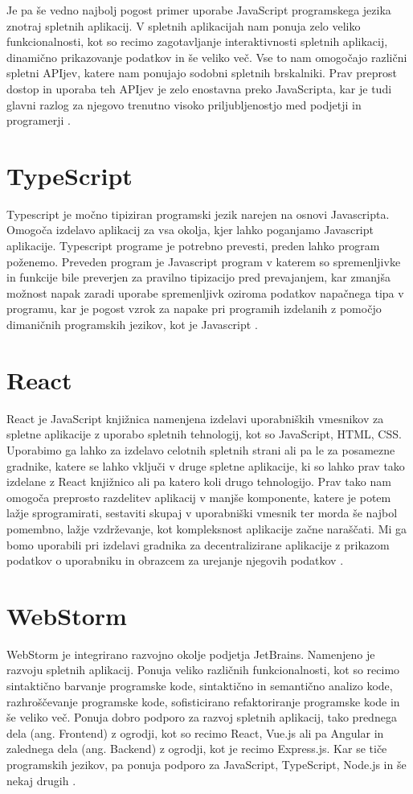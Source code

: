 \documentclass[a4paper,12pt,openright]{book}
\begin{document}
Je pa še vedno najbolj pogost primer uporabe JavaScript programskega jezika znotraj spletnih aplikacij.
V spletnih aplikacijah nam ponuja zelo veliko funkcionalnosti, kot so recimo zagotavljanje interaktivnosti spletnih
aplikacij, dinamično prikazovanje podatkov in še veliko več.
Vse to nam omogočajo različni spletni APIjev, katere nam ponujajo sodobni spletnih brskalniki.
Prav preprost dostop in uporaba teh APIjev je zelo enostavna preko JavaScripta, kar je tudi glavni razlog za njegovo
trenutno visoko priljubljenostjo med podjetji in programerji \cite{javascript_mozilla}.

\section{TypeScript}
Typescript je močno tipiziran programski jezik narejen na osnovi Javascripta. 
Omogoča izdelavo aplikacij za vsa okolja, kjer lahko poganjamo Javascript aplikacije.
Typescript programe je potrebno prevesti, preden lahko program poženemo.
Preveden program je Javascript program v katerem so spremenljivke in funkcije bile preverjen za pravilno tipizacijo 
pred prevajanjem, kar zmanjša možnost napak zaradi uporabe spremenljivk oziroma podatkov napačnega tipa v programu, 
kar je pogost vzrok za napake pri programih izdelanih z pomočjo dimaničnih programskih jezikov, kot je Javascript \cite{typescript_homepage}.

\section{React}
React je JavaScript knjižnica namenjena izdelavi uporabniških vmesnikov za spletne aplikacije z uporabo spletnih tehnologij, kot so JavaScript, HTML, CSS.
Uporabimo ga lahko za izdelavo celotnih spletnih strani ali pa le za posamezne gradnike, katere se lahko vključi v 
druge spletne aplikacije, ki so lahko prav tako izdelane z React knjižnico ali pa katero koli drugo tehnologijo.
Prav tako nam omogoča preprosto razdelitev aplikacij v manjše komponente, katere je potem lažje sprogramirati, sestaviti skupaj v uporabniški vmesnik
ter morda še najbol pomembno, lažje vzdrževanje, kot kompleksnost aplikacije začne naraščati.
Mi ga bomo uporabili pri izdelavi gradnika za decentralizirane aplikacije z prikazom podatkov o uporabniku in obrazcem za urejanje njegovih podatkov \cite{react_homepage}.


\section{WebStorm}
WebStorm je integrirano razvojno okolje podjetja JetBrains.
Namenjeno je razvoju spletnih aplikacij. 
Ponuja veliko različnih funkcionalnosti, kot so recimo sintaktično barvanje programske kode, sintaktično in semantično
analizo kode, razhroščevanje programske kode, sofisticirano refaktoriranje programske kode in še veliko več.
Ponuja dobro podporo za razvoj spletnih aplikacij, tako prednega dela (ang. Frontend) z ogrodji, kot so recimo React, Vue.js ali pa Angular
in zalednega dela (ang. Backend) z ogrodji, kot je recimo Express.js.
Kar se tiče programskih jezikov, pa ponuja podporo za JavaScript, TypeScript, Node.js in še nekaj drugih \cite{jetbrains_webstorm}.
\end{document}
